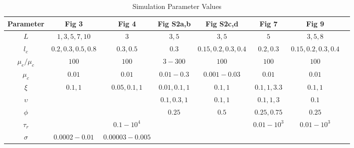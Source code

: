 \begin{table}
		\centering
		\caption{Simulation Parameter Values}
		\label{table:para2}
		\begin{tabular}{|c|ccccccc|}
			\hline
			Parameter     & \textbf{Fig 3}          & \textbf{Fig 4}       & \textbf{Fig S2a,b}    & \textbf{Fig S2c,d}     & \textbf{Fig 7}    & \textbf{Fig 9}          \\ \hline
			$L$           & $1,3,5,7,10$      & $3$             & $3,5$         & $3,5$                 & $5$         & $3,5,8$            \\ 
			$l_c$         & $0.2,0.3,0.5,0.8$ & $0.3,0.5$       & $0.3$       & $0.15,0.2,0.3,0.4$ & $0.2,0.3$        & $0.15,0.2,0.3,0.4$ \\ 
			$\mu_e/\mu_c$ & $100$             & $100$           & $3-300$     & $100$     & $100$           & $100$              \\ 
			$\mu_c$       & $0.01$            & $0.01$          & $0.01-0.3$  & $0.001-0.03$       & $0.01$      & $0.01$             \\ 
			$\xi$         & $0.1,1$          & $0.05,0.1,1$      & $0.01,0.1,1$  & $0.1,1$  & $0.1,1,3.3$   & $0.1,1$           \\ 
			$\upsilon$    & ~                 & ~               & $0.1,0.3,1$ & $0.1,1$   & $0.1,1,3$    & $0.1$              \\ 
			$\phi$        & ~                 & ~               & $0.25$      & $0.5$     & $0.25,0.75$    & $0.25$             \\ 
			$\tau_r$      & ~                 & $0.1-10^4$      & ~           & ~         & $0.01-10^3$  & $0.01-10^3$              \\ 
			$\sigma$      & $0.0002-0.01$     & $0.00003-0.005$ & ~           & ~         & ~            & ~                          \\
			\hline
		\end{tabular}
\end{table}


